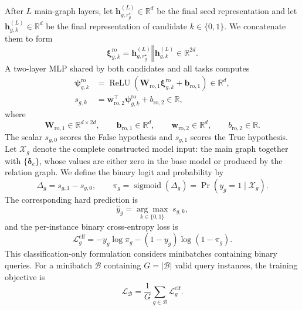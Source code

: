\documentclass[11pt]{article}
\newcommand{\R}{\mathbb{R}}
\newcommand{\concat}{\mathbin{\Vert}}
\DeclareMathOperator{\ReLU}{ReLU}
\DeclareMathOperator{\sigmoid}{sigmoid}
\begin{document}
After \(L\) main-graph layers, let
\(\mathbf h_{g,r_g^\star}^{(L)}\in\R^d\) be the final seed representation and
let \(\mathbf h_{g,k}^{(L)}\in\R^d\) be the final representation of
candidate \(k\in\{0,1\}\).  We concatenate them to form
\begin{equation}
    \boldsymbol\xi_{g,k}^{\mathrm{ro}}
    =
    \mathbf h_{g,r_g^\star}^{(L)}
    \concat
    \mathbf h_{g,k}^{(L)}
    \in\R^{2d}.
    \label{eq:readout-input}
\end{equation}
A two-layer MLP shared by both candidates and all tasks computes
\begin{align}
    \boldsymbol\psi_{g,k}^{\mathrm{ro}}
    &=
    \ReLU
    \left(
        \mathbf W_{\mathrm{ro},1}
        \boldsymbol\xi_{g,k}^{\mathrm{ro}}
        +
        \mathbf b_{\mathrm{ro},1}
    \right)
    \in\R^d,
    \label{eq:readout-hidden}\\
    s_{g,k}
    &=
    \mathbf w_{\mathrm{ro},2}^{\top}
    \boldsymbol\psi_{g,k}^{\mathrm{ro}}
    +
    b_{\mathrm{ro},2}
    \in\R,
    \label{eq:candidate-score}
\end{align}
where
\begin{equation}
    \mathbf W_{\mathrm{ro},1}\in\R^{d\times2d},
    \qquad
    \mathbf b_{\mathrm{ro},1}\in\R^d,
    \qquad
    \mathbf w_{\mathrm{ro},2}\in\R^d,
    \qquad
    b_{\mathrm{ro},2}\in\R.
    \label{eq:readout-domains}
\end{equation}
The scalar \(s_{g,0}\) scores the False hypothesis and \(s_{g,1}\) scores
the True hypothesis.  Let \(\mathcal X_g\) denote the complete constructed
model input: the main graph together with \(\{\boldsymbol\delta_e\}\), whose
values are either zero in the base model or produced by the relation graph.
We define the binary logit and probability by
\begin{equation}
    \Delta_g
    =
    s_{g,1}-s_{g,0},
    \qquad
    \pi_g
    =
    \sigmoid(\Delta_g)
    =
    \Pr\!\left(y_g=1\mid\mathcal X_g\right).
    \label{eq:classification-probability}
\end{equation}
The corresponding hard prediction is
\begin{equation}
    \widehat y_g
    =
    \underset{k\in\{0,1\}}{\arg\max}\;s_{g,k},
    \label{eq:classification-prediction}
\end{equation}
and the per-instance binary cross-entropy loss is
\begin{equation}
    \mathcal L_g^{\mathrm{clf}}
    =
    -y_g\log \pi_g
    -(1-y_g)\log(1-\pi_g).
    \label{eq:classification-loss}
\end{equation}
This classification-only formulation considers minibatches containing
binary queries.  For a minibatch \(\mathcal B\) containing
\(G=|\mathcal B|\) valid query instances, the training objective is
\begin{equation}
    \boxed{
    \mathcal L_{\mathcal B}
    =
    \frac{1}{G}
    \sum_{g\in\mathcal B}
    \mathcal L_g^{\mathrm{clf}}
    }.
    \label{eq:batch-loss}
\end{equation}
\end{document}
